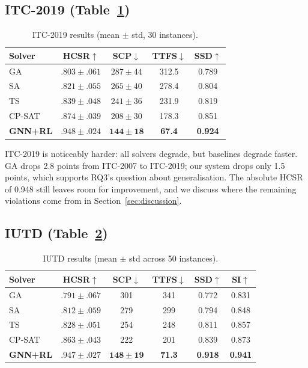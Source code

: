 \documentclass[conference]{IEEEtran}
\begin{document}
\subsection{ITC-2019 (Table~\ref{tab:t2})}

\begin{table}[ht]
\centering
\caption{ITC-2019 results (mean $\pm$ std, 30 instances).}
\label{tab:t2}
\small
\begin{tabular}{lcccc}
\toprule
\textbf{Solver} & \textbf{HCSR$\uparrow$} & \textbf{SCP$\downarrow$} & \textbf{TTFS$\downarrow$} & \textbf{SSD$\uparrow$} \\
\midrule
GA      & $.803{\pm}.061$ & $287{\pm}44$ & 312.5 & 0.789 \\
SA      & $.821{\pm}.055$ & $265{\pm}40$ & 278.4 & 0.804 \\
TS      & $.839{\pm}.048$ & $241{\pm}36$ & 231.9 & 0.819 \\
CP-SAT  & $.874{\pm}.039$ & $208{\pm}30$ & 178.3 & 0.851 \\
\midrule
\textbf{GNN+RL} & $\mathbf{.948{\pm}.024}$ & $\mathbf{144{\pm}18}$ & \textbf{67.4} & \textbf{0.924} \\
\bottomrule
\end{tabular}
\end{table}

ITC-2019 is noticeably harder: all solvers degrade, but baselines degrade faster. GA drops 2.8 points from ITC-2007 to ITC-2019; our system drops only 1.5 points, which supports RQ3's question about generalisation. The absolute HCSR of 0.948 still leaves room for improvement, and we discuss where the remaining violations come from in Section~\ref{sec:discussion}.

\subsection{IUTD (Table~\ref{tab:t3})}

\begin{table}[ht]
\centering
\caption{IUTD results (mean $\pm$ std across 50 instances).}
\label{tab:t3}
\footnotesize
\begin{tabular}{@{}lccccc@{}}
\toprule
\textbf{Solver} & \textbf{HCSR$\uparrow$} & \textbf{SCP$\downarrow$} & \textbf{TTFS$\downarrow$} & \textbf{SSD$\uparrow$} & \textbf{SI$\uparrow$} \\
\midrule
GA      & $.791{\pm}.067$ & 301 & 341 & 0.772 & 0.831 \\
SA      & $.812{\pm}.059$ & 279 & 299 & 0.794 & 0.848 \\
TS      & $.828{\pm}.051$ & 254 & 248 & 0.811 & 0.857 \\
CP-SAT  & $.863{\pm}.043$ & 222 & 201 & 0.839 & 0.873 \\
\midrule
\textbf{GNN+RL} & $\mathbf{.947{\pm}.027}$ & $\mathbf{148{\pm}19}$ & \textbf{71.3} & \textbf{0.918} & \textbf{0.941} \\
\bottomrule
\end{tabular}
\end{table}
\end{document}
